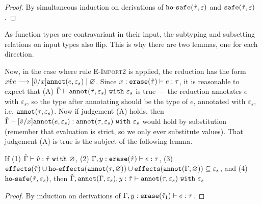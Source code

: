 {\begin{proof}
By simultaneous induction on derivations of $\mathtt{ho \hbox{-} safe}(\hat \tau, \varepsilon)$ and
$\mathtt{safe}(\hat \tau, \varepsilon)$.
\end{proof}

As function types are contravariant in their input, the subtyping and subsetting
relations on input types also flip. This is why there are two lemmas, one for each
direction.

Now, in the case where rule \textsc{E-Import2} is applied, the reduction has the form
${x}{\hat v}{e} \longrightarrow
[\hat v/x]\mathtt{annot}(e, \varepsilon_s) \mid \varnothing$. Since
$x: \mathtt{erase}(\hat \tau) \vdash e: \tau$, it is reasonable to expect that (A) $\hat
\Gamma \vdash \mathtt{annot}(\hat \tau, \varepsilon_s)~\mathtt{with}~ \varepsilon_s$ is true
--- the reduction annotates $e$ with $\varepsilon_s$, so the type after annotating
should be the type of $e$, annotated with $\varepsilon_s$, i.e.
$\mathtt{annot}(\tau, \varepsilon_s)$. Now if judgement (A) holds, then $\hat \Gamma
\vdash [\hat v/x]\mathtt{annot}(e, \varepsilon_s): \mathtt{annot}(\tau, \varepsilon_s)~\mathtt{with}~
\varepsilon_s$ would hold by substitution (remember that evaluation is strict, so
we only ever substitute values). That judgement (A) is true is the subject of the
following lemma.

\begin{lemma}
If 
(1) $\hat \Gamma \vdash \hat v: \hat \tau ~ \mathtt{with}~ \varnothing$,
(2) $\Gamma, y: \mathtt{erase}(\hat \tau) \vdash e: \tau$,
(3) $\mathtt{effects}(\hat \tau) \cup \mathtt{ho \hbox{-} effects}(\mathtt{annot}(\tau, \varnothing)) \cup
    \mathtt{effects}(\mathtt{annot}(\Gamma, \varnothing)) \subseteq \varepsilon_s$, and
(4) $\mathtt{ho \hbox{-} safe}(\hat \tau, \varepsilon_s)$,
then $\hat \Gamma, \mathtt{annot}(\Gamma, \varepsilon_s), y: \hat \tau \vdash
	\mathtt{annot}(\tau, \varepsilon_s) ~\mathtt{with}~ \varepsilon_s$

\end{lemma}

\begin{proof}
By induction on derivations of $\Gamma, y: \mathtt{erase}(\hat \tau_1) \vdash e: \tau$.


\end{proof}}
